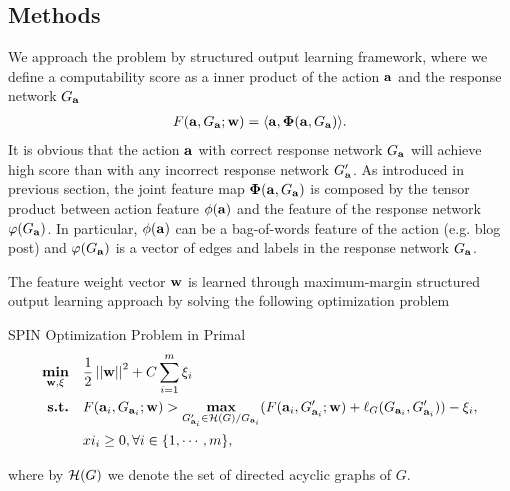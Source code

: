 {%
%
\subsection{Methods}
We approach the problem by structured output learning framework, where we define a computability score as a inner product of the action $\mathbf {a}$ and the response network $G_{\mathbf {a}}$
\begin{align*}
	F(\mathbf {a},G_{\mathbf {a}};\mathbf {w}) = \langle \mathbf {a}, \mathbf{\Phi}(\mathbf {a},G_{\mathbf {a}}) \rangle.
\end{align*}
It is obvious that the action $\mathbf {a}$ with correct response network $G_{\mathbf {a}}$ will achieve high score than with any incorrect response network $G_{\mathbf {a}}'$.
As introduced in previous section, the joint feature map $\mathbf{\Phi}(\mathbf {a},G_{\mathbf {a}})$ is composed by the tensor product between action feature $\phi(\mathbf {a})$ and the feature of the response network $\varphi(G_{\mathbf {a}})$.
In particular, $\phi(\mathbf {a})$ can be a bag-of-words feature of the action (e.g. blog post) and $\varphi(G_{\mathbf {a}})$ is a vector of edges and labels in the response network $G_{\mathbf {a}}$.

The feature weight vector $\mathbf {w}$ is learned through maximum-margin structured output learning approach by solving the following optimization problem
\begin{definition}{SPIN Optimization Problem in Primal}
\begin{align*}
	\underset{\mathbf {w},\mathbf{\xi}}{\textbf{min}} &\quad \frac{1}{2}\left|\left| \mathbf {w} \right|\right|^2+C\sum_{i=1}^{m}\xi_i\\
	\textbf{s.t.} &\quad F(\mathbf {a}_i,G_{\mathbf {a}_i};\mathbf {w}) > \underset{G_{\mathbf {a}_i}'\in\mathcal{H}(G)/G_{\mathbf {a}_i}}{\textbf{max}}(F(\mathbf {a}_i,G_{\mathbf {a}_i}';\mathbf {w})+\mathbf {\ell}_{G}(G_{\mathbf {a}_i},G_{\mathbf {a}_i}')) - \xi_i,\\
	&\quad xi_i\ge0, \forall i\in\{1,\cdots,m\},
\end{align*}
\end{definition}
where by $\mathcal{H}(G)$ we denote the set of directed acyclic graphs of $G$.

}
